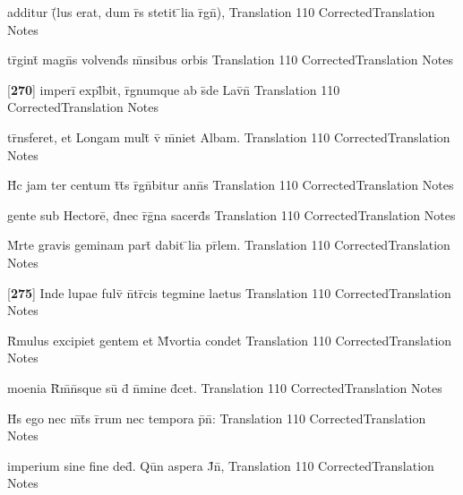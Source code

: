 \documentclass[]{book}
\begin{document}
\latline
  {additur (\={}lus erat, dum r\={}s stetit \={}lia r\={}gn\={}),}
  { Translation }
  {110}
  { CorrectedTranslation }
  { Notes }


\latline
  {tr\={\macron {\i}}gint\={} magn\={}s volvend\={\macron {\i}}s m\={}nsibus orbis}
  { Translation }
  {110}
  { CorrectedTranslation }
  { Notes }


\latline
  {[\textbf{270}] imperi\={} expl\={}bit, r\={}gnumque ab s\={}de Lav\={\macron {\i}}n\={\macron {\i}}}
  { Translation }
  {110}
  { CorrectedTranslation }
  { Notes }


\latline
  {tr\={}nsferet, et Longam mult\={} v\={\macron {\i}} m\={}niet Albam.}
  { Translation }
  {110}
  { CorrectedTranslation }
  { Notes }


\latline
  {H\={\macron {\i}}c jam ter centum t\={}t\={}s r\={}gn\={}bitur ann\={}s }
  { Translation }
  {110}
  { CorrectedTranslation }
  { Notes }


\latline
  {gente sub Hectore\={}, d\={}nec r\={}g\={\macron {\i}}na sacerd\={}s}
  { Translation }
  {110}
  { CorrectedTranslation }
  { Notes }


\latline
  {M\={}rte gravis geminam part\={} dabit \={}lia pr\={}lem.}
  { Translation }
  {110}
  { CorrectedTranslation }
  { Notes }


\latline
  {[\textbf{275}] Inde lupae fulv\={} n\={}tr\={\macron {\i}}cis tegmine laetus}
  { Translation }
  {110}
  { CorrectedTranslation }
  { Notes }


\latline
  {R\={}mulus excipiet gentem et M\={}vortia condet}
  { Translation }
  {110}
  { CorrectedTranslation }
  { Notes }


\latline
  {moenia R\={}m\={}n\={}sque su\={} d\={} n\={}mine d\={\macron {\i}}cet.}
  { Translation }
  {110}
  { CorrectedTranslation }
  { Notes }


\latline
  {H\={\macron {\i}}s ego nec m\={}t\={}s r\={}rum nec tempora p\={}n\={}:}
  { Translation }
  {110}
  { CorrectedTranslation }
  { Notes }


\latline
  {imperium sine fine ded\={\macron {\i}}.  Qu\={\macron {\i}}n aspera J\={}n\={},}
  { Translation }
  {110}
  { CorrectedTranslation }
  { Notes }
\end{document}
